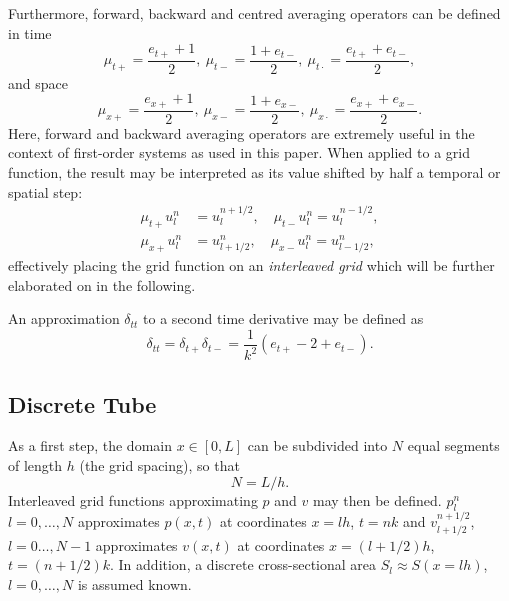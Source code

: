 Furthermore, forward, backward and centred averaging operators can be defined in time
\begin{equation}
    \mu_{t+} = \frac{e_{t+} + 1}{2}, \ \mu_{t-} = \frac{1 + e_{t-}}{2}, \ \mu_{t\cdot} = \frac{e_{t+}+e_{t-}}{2},
\end{equation}
and space
\begin{equation}
    \mu_{x+} = \frac{e_{x+} + 1}{2}, \ \mu_{x-} = \frac{1 + e_{x-}}{2}, \ \mu_{x\cdot} = \frac{e_{x+}+e_{x-}}{2}.
\end{equation}
Here, forward and backward averaging operators are extremely useful in the context of first-order systems as used in this paper. When applied to a grid function, the result may be interpreted as its value shifted by half a temporal or spatial step: 
\begin{align}
    \mu_{t+}u_l^n &= u_l^{n+1/2}, \quad \mu_{t-}u_l^n = u_l^{n-1/2},\\
    \mu_{x+}u_l^n &= u_{l+1/2}^n, \quad \mu_{x-}u_l^n = u_{l-1/2}^n,
\end{align}
effectively placing the grid function on an \textit{interleaved grid} which will be further elaborated on in the following.  
 
An approximation $\delta_{tt}$ to a second time derivative may be defined as
\begin{equation}
    \delta_{tt} = \delta_{t+}\delta_{t-} = \frac{1}{k^2}\left(e_{t+}-2+e_{t-}\right).
\end{equation}

\subsection{Discrete Tube}\label{sec:discSyst}
As a first step, the domain $x\in [0, L]$ can be subdivided into $N$ equal segments of length $h$ (the grid spacing), so that
\begin{equation}\label{eq:numberOfIntervals}
    N=L/h.
\end{equation}
Interleaved grid functions approximating $p$ and $v$ may then be defined. $p_l^n$ $l=0,\hdots,N$ \SWcomment[Just a question about notation here.. Is there a difference between $l = {[}0, \hdots, N{]}$, $l = 0, \hdots, N$ and $l\in{[}0, \hdots, N{]}$ and when to use which?] approximates $p(x,t)$ at coordinates $x=lh$, $t=nk$ and $v_{l+1/2}^{n+1/2}$, $l=0\hdots,N-1$ approximates $v(x,t)$ at coordinates $x=(l+1/2)h$, $t=(n+1/2)k$. In addition, a discrete cross-sectional area $S_l\approx S(x=lh)$, $l=0,\hdots,N$ is assumed known.

